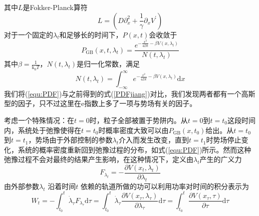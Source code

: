 其中$L$是Fokker-Planck算符
\begin{equation}
L=\left(D \partial_{x}^{2}+\frac{1}{\gamma} \partial_{x} V^{\prime}\right)
\label{equ:FPoper}
\end{equation}
对于一个固定的$\lambda_t$和足够长的时间下，$P(x,t)$会收敛于
\begin{equation}
P_{\mathrm{GB}}\left(x, t, \lambda_{t}\right)=\frac{e^{-\frac{x^{2}}{4 D t}-\beta V\left(x, \lambda_{t}\right)}}{N\left(t, \lambda_{t}\right)}
\label{equ:PDF}
\end{equation}
其中$\beta=\frac{1}{\mathrm{k}_{0}T}$，$N(t,\lambda_t)$是归一化常数，满足
\begin{equation}
N\left(t, \lambda_{t}\right)=\int_{-\infty}^{\infty} e^{-\frac{x^{2}}{4 D t}-\beta V\left(x, \lambda_{t}\right)} \mathrm{d} x
\end{equation}
我们将(\ref{equ:PDF})与之前得到的式(\ref{PDFjiang})对比，我们发现两者都有一个高斯型的因子，只不过这里在e指数上多了一项与势场有关的因子。

考虑一个特殊情况：在$t=0$时，粒子全部被置于势阱内。从$t=0$到$t=t_0$这段时间内，系统处于弛豫使得在$t=t_0$时概率密度大致可以由$P_{\mathrm{GB}}(x,t_0)$给出。从$t=t_0$到$t=t_1$，势场由于外部控制的参数$\lambda_t$介入而发生改变，直到$t=t_1$时势场停止变化，系统的概率密度重新回到弛豫过程的分布，如式(\ref{equ:PDF})所示。然而这种弛豫过程不会对最终的结果产生影响，在这种情况下，定义由$\lambda_t$产生的广义力\cite{streissnigWorkFluctuationTheorem2021}
\begin{equation}
F_{\lambda_t}=-\frac{\partial V(x_t,\lambda_t)}{\partial\lambda_t}
\end{equation}
由外部参数$\lambda_t$ 沿着时间$t$ 依赖的轨道所做的功可以利用功率对时间的积分表示为
\begin{equation}
W_{t}=-\int_{t_{0}}^{t} \dot{\lambda}_{\tau}F_{\lambda_{\tau}}\mathrm{d} \tau=\int_{t_{0}}^{t} \dot{\lambda}_{\tau} \frac{\partial V\left(x_{\tau}, \lambda_{\tau}\right)}{\partial \lambda_{\tau}} \mathrm{d} \tau=\int_{t_{0}}^{t} \frac{\partial V\left(x_{\tau}, \tau\right)}{\partial \tau} \mathrm{d} \tau
\label{equ:Wt}
\end{equation}

